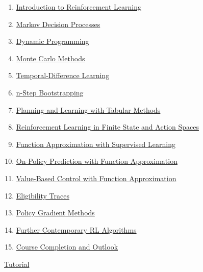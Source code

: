 \documentclass[11pt]{article}
\begin{document}
\begin{enumerate}
	\item  \href{https://mp.weixin.qq.com/s/wbjVcTLvAXxvD9tpQj1gGg}{Introduction to Reinforcement Learning} %
	\item  \href{https://mp.weixin.qq.com/s/1sytOReDyGq6rxM1haxN3g}{Markov Decision Processes} %
	\item  \href{https://mp.weixin.qq.com/s/SSjSL8i990Q6sohGCZMBew}{Dynamic Programming} %
	\item  \href{https://mp.weixin.qq.com/s/2Yy4Kndto97x60XVigVhqA}{Monte Carlo Methods} %
	\item  \href{https://mp.weixin.qq.com/s/lbWzISUof9JVx3A5RSaXZQ}{Temporal-Difference Learning} %
	\item  \href{https://mp.weixin.qq.com/s/ZVbUvJq-S2ZiJ4BgBQZgXw}{n-Step Bootstrapping} %
	\item  \href{https://mp.weixin.qq.com/s/BjefQRDak19vIuhFMIPs8g}{Planning and Learning with Tabular Methods} %
	\item  \href{https://mp.weixin.qq.com/s/vQkOAS3Dx22xj1rcDcR9uQ}{Reinforcement Learning in Finite State and Action Spaces} %
	\item  \href{https://mp.weixin.qq.com/s/c1ph8uO17kXTYfu8hHGrmA}{Function Approximation with Supervised Learning} %
	\item  \href{https://mp.weixin.qq.com/s/lSQShYzxn9fVH54ebnqHLQ}{On-Policy Prediction with Function Approximation} %
	\item  \href{https://mp.weixin.qq.com/s/A3MGjiVIbTDcZX1zbQhHZg}{Value-Based Control with Function Approximation} %
	\item  \href{https://mp.weixin.qq.com/s/a7KmoyhL3mctpDucdApiWQ}{Eligibility Traces} %
	\item  \href{https://mp.weixin.qq.com/s/8FkfFUQE_QmzTZAOOFKbiw}{Policy Gradient Methods} %
	\item  \href{https://mp.weixin.qq.com/s/UYPhyuwv1GbEHRxkWGVpng}{Further Contemporary RL Algorithms} %
	\item  \href{https://mp.weixin.qq.com/s/3mepjTPMv-90QDjj-gQYnQ}{Course Completion and Outlook} %
\end{enumerate}

\vspace{-1cm}

\begin{center}
	\large \href{https://www.youtube.com/playlist?list=PL4GzQQuIDBGtzU2oaDIGhDaVBwuAs8Od5}{Tutorial}
\end{center}
\end{document}
